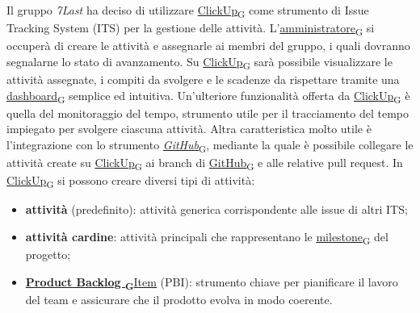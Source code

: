 Il gruppo \textit{7Last} ha deciso di utilizzare \href{https://7last.github.io/docs/rtb/documentazione-interna/glossario\#clickup}{ClickUp\textsubscript{G}} come strumento di Issue Tracking System (ITS) per la gestione delle attività. L'\href{https://7last.github.io/docs/rtb/documentazione-interna/glossario\#amministratore}{amministratore\textsubscript{G}} si occuperà di creare le attività e assegnarle ai membri del gruppo, i quali dovranno segnalarne lo stato di avanzamento. Su \href{https://7last.github.io/docs/rtb/documentazione-interna/glossario\#clickup}{ClickUp\textsubscript{G}} sarà possibile visualizzare le attività assegnate, i compiti da svolgere e le scadenze da rispettare tramite una \href{https://7last.github.io/docs/rtb/documentazione-interna/glossario\#dashboard}{dashboard\textsubscript{G}} semplice ed intuitiva. Un'ulteriore funzionalità offerta da \href{https://7last.github.io/docs/rtb/documentazione-interna/glossario\#clickup}{ClickUp\textsubscript{G}} è quella del monitoraggio del tempo, strumento utile per il tracciamento del tempo impiegato per svolgere ciascuna attività. Altra caratteristica molto utile è l'integrazione con lo strumento \href{https://7last.github.io/docs/rtb/documentazione-interna/glossario\#github}{\textit{GitHub}\textsubscript{G}}, mediante la quale è possibile collegare le attività create su \href{https://7last.github.io/docs/rtb/documentazione-interna/glossario\#clickup}{ClickUp\textsubscript{G}} ai branch di \href{https://7last.github.io/docs/rtb/documentazione-interna/glossario\#github}{GitHub\textsubscript{G}} e alle relative pull request.
In \href{https://7last.github.io/docs/rtb/documentazione-interna/glossario\#clickup}{ClickUp\textsubscript{G}} si possono creare diversi tipi di attività:
\begin{itemize}
    \item \textbf{attività} (predefinito): attività generica corrispondente alle issue di altri ITS;
    \item \textbf{attività cardine}: attività principali che rappresentano le \href{https://7last.github.io/docs/rtb/documentazione-interna/glossario\#milestone}{milestone\textsubscript{G}} del progetto;
    \item \href{https://7last.github.io/docs/rtb/documentazione-interna/glossario\#product-backlog}{\textbf{Product Backlog \textsubscript{G}}Item} (PBI): strumento chiave per pianificare il lavoro del team e assicurare che il prodotto evolva in modo coerente.    
\end{itemize}
